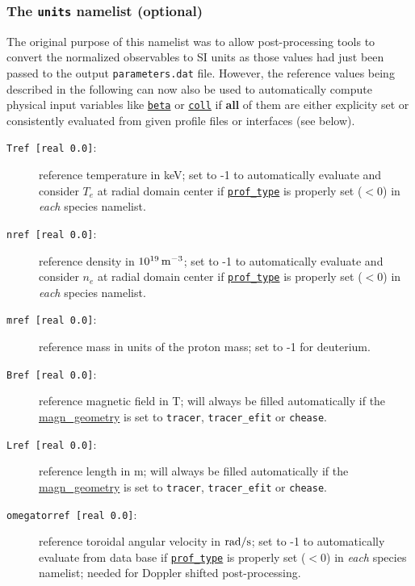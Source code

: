 \documentclass[12pt]{article}
\begin{document}
\subsubsection{{The \texttt{units} namelist (optional)}}\label{sec:units_nml}
\hypertarget{units_nml}{}
The original purpose of this namelist was to allow post-processing tools to convert the normalized observables to SI units as those values had just been passed to the output \texttt{parameters.dat} file. However, the reference values being described in the following can now also be used to automatically compute physical input variables like \hyperlink{beta}{\tt beta} or \hyperlink{coll}{\tt coll} if {\bf all} of them are either explicity set or consistently evaluated from given profile files or interfaces (see below).
\begin{description}
\item[\texttt{Tref [real 0.0]}:] reference temperature in keV; set to -1 to automatically evaluate and consider $T_e$ at radial domain center if \hyperlink{prof_type}{\tt prof\_type} is properly set ($<0$) in {\em each} species namelist.
\item[\texttt{nref [real 0.0]}:] reference density in $10^{19}\,{\rm m}^{-3}$; set to -1 to automatically evaluate and consider $n_e$ at radial domain center if \hyperlink{prof_type}{\tt prof\_type} is properly set ($<0$) in {\em each} species namelist.
\item[\texttt{mref [real 0.0]}:] reference mass in units of the proton mass; set to -1 for deuterium.
\item[\texttt{Bref [real 0.0]}:] reference magnetic field in T; will always be filled automatically if the \hyperlink{magn_geometry}{magn\_geometry} is set to \texttt{tracer}, \texttt{tracer\_efit} or \texttt{chease}.
\item[\texttt{Lref [real 0.0]}:] reference length in m; will always be filled automatically if the \hyperlink{magn_geometry}{magn\_geometry} is set to \texttt{tracer}, \texttt{tracer\_efit} or \texttt{chease}.
\item[\hypertarget{omegatorref}{\texttt{omegatorref [real 0.0]}}:] reference toroidal angular velocity in ${\rm rad}/{\rm s}$; set to -1 to automatically evaluate from data base if \hyperlink{prof_type}{\tt prof\_type} is properly set ($<0$) in {\em each} species namelist; needed for Doppler shifted post-processing.
\end{description}



\newpage
\end{document}
